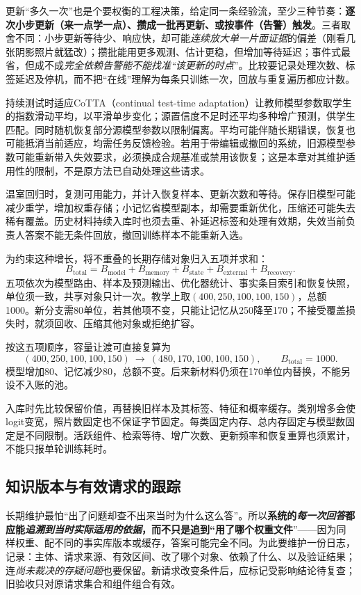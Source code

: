 更新“多久一次”也是个要权衡的工程决策，给定同一条经验流，至少三种节奏：\textbf{逐次小步更新（来一点学一点）、攒成一批再更新、或按事件（告警）触发}。三者取舍不同：小步更新等待少、响应快，却可能\emph{连续放大单一片面证据}的偏差（刚看几张阴影照片就猛改）；攒批能用更多观测、估计更稳，但增加等待延迟；事件式最省，但成不成\emph{完全依赖告警能不能找准“该更新的时点}”。比较要记录处理次数、标签延迟及停机，而不把“在线”理解为每条只训练一次，回放与重复遍历都应计数。

持续测试时适应CoTTA（continual test-time adaptation）让教师模型参数取学生的指数滑动平均，以平滑单步变化；源置信度不足时还平均多种增广预测，供学生匹配。同时随机恢复部分源模型参数以限制偏离。平均可能伴随长期错误，恢复也可能抵消当前适应，均需任务反馈检验。若用于带编辑或撤回的系统，旧源模型参数可能重新带入失效要求，必须换成合规基准或禁用该恢复；这是本章对其维护适用性的限制，不是原方法已自动处理这些请求。

温室回归时，复测可用能力，并计入恢复样本、更新次数和等待。保存旧模型可能减少重学，增加权重存储；小记忆省模型副本，却需要重新优化，压缩还可能失去稀有覆盖。历史材料持续入库时也须去重、补延迟标签和处理有效期，失效当前负责人答案不能无条件回放，撤回训练样本不能重新入选。

为约束这种增长，将不重叠的长期存储对象归入五项并求和：
\[
B_{\mathrm{total}}
=B_{\mathrm{model}}+B_{\mathrm{memory}}+B_{\mathrm{state}}
+B_{\mathrm{external}}+B_{\mathrm{recovery}}.
\]
五项依次为模型路由、样本及预测输出、优化器统计、事实条目索引和恢复快照，单位须一致，共享对象只计一次。教学上取$(400,250,100,100,150)$，总额1000。新分支需80单位，若其他项不变，只能让记忆从250降至170；不接受覆盖损失时，就须回收、压缩其他对象或拒绝扩容。

按这五项顺序，容量让渡可直接复算为
\[
(400,250,100,100,150)
\ \longrightarrow\
(480,170,100,100,150),
\qquad B_{\mathrm{total}}=1000.
\]
模型增加80、记忆减少80，总额不变。后来新材料仍须在170单位内替换，不能另设不入账的池。

入库时先比较保留价值，再替换旧样本及其标签、特征和概率缓存。类别增多会使logit变宽，照片数固定也不保证字节固定。每类固定内存、总内存固定与模型数固定是不同限制。活跃组件、检索等待、增广次数、更新频率和恢复重算也须累计，不能只报单轮训练耗时。

\subsection{知识版本与有效请求的跟踪}
\label{sec:ket-update-versions}

长期维护最怕“出了问题却查不出来当时为什么这么答”。所以\textbf{系统的\emph{每一次回答}都应能\emph{追溯到当时\emph{实际适用的依据}}，而不只是追到“用了哪个权重文件}”——因为同样权重、配不同的事实库版本或缓存，答案可能完全不同。为此要维护一份日志，记录：主体、请求来源、有效区间、改了哪个对象、依赖了什么、以及验证结果；连\emph{尚未裁决的存疑问题}也要保留。新请求改变条件后，应标记受影响结论待复查；旧验收只对原请求集合和组件组合有效。

